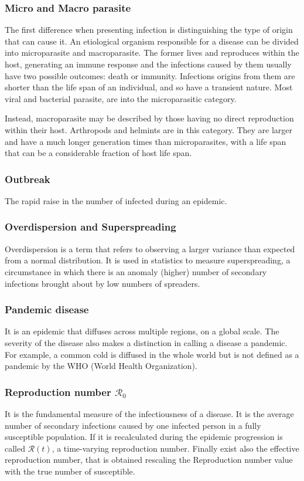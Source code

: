 \subsubsection{Micro and Macro parasite}
The first difference when presenting infection is distinguishing the type of origin that can cause it. An etiological organism responsible for a disease can be divided into microparasite and macroparasite. The former lives and reproduces within the host, generating an immune response and the infections caused by them usually have two possible outcomes: death or immunity. Infections origins from them are shorter than the life span of an individual, and so have a transient nature. Most viral and bacterial parasite, are into the microparasitic category.

Instead, macroparasite may be described by those having no direct reproduction within their host. Arthropods and helmints are in this category. They are larger and have a much longer generation times than microparasites, with a life span that can be a considerable fraction of host life span.


\subsubsection{Outbreak} The rapid raise in the number of infected during an epidemic.


\subsubsection{Overdispersion and Superspreading} Overdispersion is a term that refers to observing a larger variance than expected from a normal distribution. It is used in statistics to measure superspreading, a circumstance in which there is an anomaly (higher) number of secondary infections brought about by low numbers of spreaders.

\subsubsection{Pandemic disease} It is an epidemic that diffuses across multiple regions, on a global scale. The severity of the disease also makes a distinction in calling a disease a pandemic. For example, a common cold is diffused in the whole world but is not defined as a pandemic by the WHO (World Health Organization). 

\subsubsection{Reproduction number $\mathcal{R}_0$} It is the fundamental measure of the infectiousness of a disease. It is the average number of secondary infections caused by one infected person in a fully susceptible population. If it is recalculated during the epidemic progression is called $\mathcal{R}(t)$, a time-varying reproduction number. Finally exist also the effective reproduction number, that is obtained
rescaling the Reproduction number value with the true number of susceptible.

